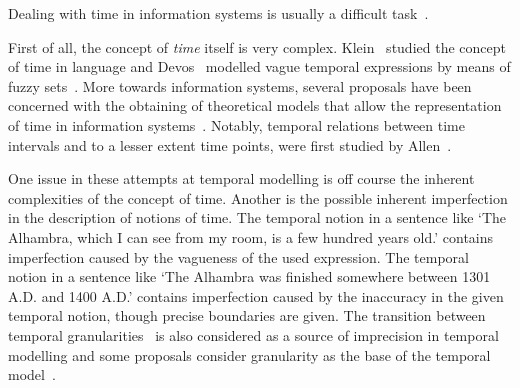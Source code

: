 Dealing with time in information systems is usually a difficult task~\cite{Bolour82}.

First of all, the concept of \emph{time} itself is very complex. Klein~\cite{klein94} studied the concept of time in language and Devos~\cite{devos94} modelled vague temporal expressions by means of fuzzy sets~\cite{zadeh65}. More towards information systems, several proposals have been concerned with the obtaining of theoretical models that allow the representation of time in information systems~\cite{Cru97}. Notably, temporal relations between time intervals and to a lesser extent time points, were first studied by Allen~\cite{Allen83}.


One issue in these attempts at temporal modelling is off course the inherent complexities of the concept of time. Another is the possible inherent imperfection in the description of notions of time. The temporal notion in a sentence like `The Alhambra, which I can see from my room, is a few hundred years old.' contains imperfection caused by the vagueness of the used expression. The temporal notion in a sentence like `The Alhambra was finished somewhere between 1301 A.D. and 1400 A.D.' contains imperfection caused by the inaccuracy in the given temporal notion, though precise boundaries are given. The transition between temporal granularities~\cite{Lin97} is also considered as a source of imprecision in temporal modelling and some proposals consider granularity as the base of the temporal model~\cite{Cru97}.


